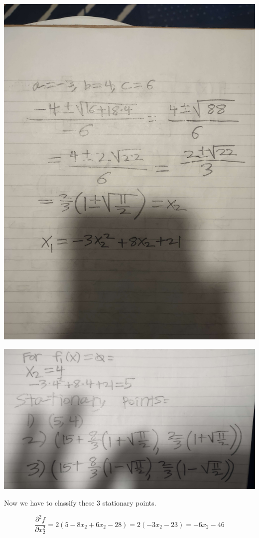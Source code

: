 \documentclass{article}
\begin{document}
\includegraphics[scale=0.1]{problem_5_4}

\includegraphics[scale=0.1]{problem_5_5}

Now we have to classify these 3 stationary points.


\[\frac{\partial^2 f}{\partial x_2^2} = 2(5 - 8x_2 + 6x_2 - 28) = 2(-3x_2 -23) = -6x_2 - 46\]
\end{document}

